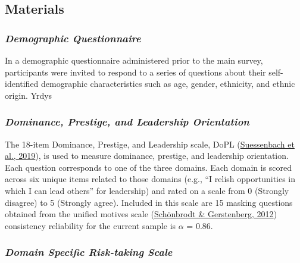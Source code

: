 \documentclass[
  donotrepeattitle,doc, 12pt, a4paper,floatsintext]{apa7}
\begin{document}
\hypertarget{materials}{%
\subsection{Materials}\label{materials}}

\newpage

\hypertarget{demographic-questionnaire}{%
\subsubsection{\texorpdfstring{\emph{Demographic Questionnaire}}{Demographic Questionnaire}}\label{demographic-questionnaire}}

In a demographic questionnaire administered prior to the main survey, participants were invited to respond to a series of questions about their self-identified demographic characteristics such as age, gender, ethnicity, and ethnic origin. Yrdys

\hypertarget{dominance-prestige-and-leadership-orientation-1}{%
\subsubsection{\texorpdfstring{\emph{Dominance, Prestige, and Leadership Orientation}}{Dominance, Prestige, and Leadership Orientation}}\label{dominance-prestige-and-leadership-orientation-1}}

The 18-item Dominance, Prestige, and Leadership scale, DoPL (\protect\hyperlink{ref-suessenbach2019}{Suessenbach et al., 2019}), is used to measure dominance, prestige, and leadership orientation. Each question corresponds to one of the three domains. Each domain is scored across six unique items related to those domains (e.g., ``I relish opportunities in which I can lead others'' for leadership) and rated on a scale from 0 (Strongly disagree) to 5 (Strongly agree). Included in this scale are 15 masking questions obtained from the unified motives scale (\protect\hyperlink{ref-schonbrodt2012}{Schönbrodt \& Gerstenberg, 2012}) consistency reliability for the current sample is \(\alpha\) = 0.86.

\hypertarget{domain-specific-risk-taking-scale}{%
\subsubsection{\texorpdfstring{\emph{Domain Specific Risk-taking Scale}}{Domain Specific Risk-taking Scale}}\label{domain-specific-risk-taking-scale}}
\end{document}
